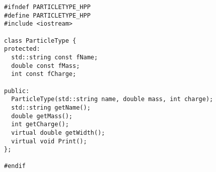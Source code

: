 \begin{lstlisting}
#ifndef PARTICLETYPE_HPP
#define PARTICLETYPE_HPP
#include <iostream>

class ParticleType {
protected:
  std::string const fName;
  double const fMass;
  int const fCharge;

public:
  ParticleType(std::string name, double mass, int charge);
  std::string getName();
  double getMass();
  int getCharge();
  virtual double getWidth();
  virtual void Print();
};

#endif
\end{lstlisting}